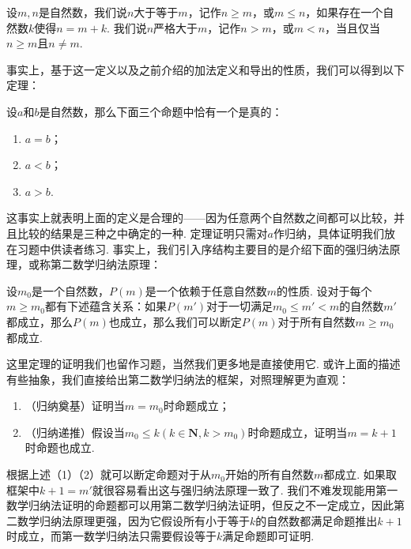 \begin{definition*}
    设$m,n$是自然数，我们说$n$大于等于$m$，记作$n\geqslant m$，或$m\leqslant n$，如果存在一个自然数$k$使得$n=m+k$. 我们说$n$严格大于$m$，记作$n>m$，或$m<n$，当且仅当$n\geqslant m$且$n\neq m$.
\end{definition*}

事实上，基于这一定义以及之前介绍的加法定义和导出的性质，我们可以得到以下定理：

\begin{theorem*}
    设$a$和$b$是自然数，那么下面三个命题中恰有一个是真的：
    \begin{enumerate}
        \item $a=b$；
        \item $a<b$；
        \item $a>b$.
    \end{enumerate}
\end{theorem*}

这事实上就表明上面的定义是合理的——因为任意两个自然数之间都可以比较，并且比较的结果是三种之中确定的一种. 定理证明只需对$a$作归纳，具体证明我们放在习题中供读者练习. 事实上，我们引入序结构主要目的是介绍下面的强归纳法原理，或称第二数学归纳法原理：

\begin{theorem*}
    设$m_0$是一个自然数，$P(m)$是一个依赖于任意自然数$m$的性质. 设对于每个$m\geqslant m_0$都有下述蕴含关系：如果$P(m')$对于一切满足$m_0\leqslant m'<m$的自然数$m'$都成立，那么$P(m)$也成立，那么我们可以断定$P(m)$对于所有自然数$m\geqslant m_0$都成立.
\end{theorem*}

这里定理的证明我们也留作习题，当然我们更多地是直接使用它. 或许上面的描述有些抽象，我们直接给出第二数学归纳法的框架，对照理解更为直观：
\begin{enumerate}
    \item （归纳奠基）证明当$m=m_0$时命题成立；
    \item （归纳递推）假设当$m_0\leqslant k(k\in\mathbf{N},k>m_0)$时命题成立，证明当$m=k+1$时命题也成立.
\end{enumerate}
根据上述（1）（2）就可以断定命题对于从$m_0$开始的所有自然数$m$都成立. 如果取框架中$k+1=m'$就很容易看出这与强归纳法原理一致了. 我们不难发现能用第一数学归纳法证明的命题都可以用第二数学归纳法证明，但反之不一定成立，因此第二数学归纳法原理更强，因为它假设所有小于等于$k$的自然数都满足命题推出$k+1$时成立，而第一数学归纳法只需要假设等于$k$满足命题即可证明.

